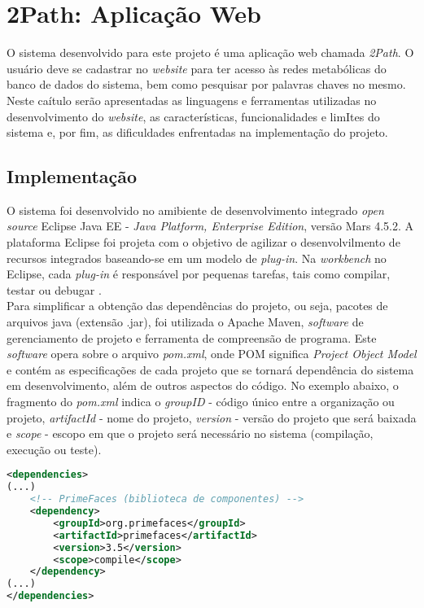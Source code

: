 \chapter{2Path: Aplicação Web}

\indent O sistema desenvolvido para este projeto é uma aplicação web chamada \textit{2Path}. O usuário deve se cadastrar no \textit{website} para ter acesso às redes metabólicas do banco de dados do sistema, bem como pesquisar por palavras chaves no mesmo. Neste caítulo serão apresentadas as linguagens e ferramentas utilizadas no desenvolvimento do \textit{website}, as características, funcionalidades e limItes do sistema e, por fim, as dificuldades enfrentadas na implementação do projeto.

\section{Implementação}

\indent O sistema foi desenvolvido no amibiente de desenvolvimento integrado \textit{open source} Eclipse Java EE - \textit{Java Platform, Enterprise Edition}, versão Mars 4.5.2. A plataforma Eclipse foi projeta com o objetivo de agilizar o desenvolvilmento de recursos integrados baseando-se em um modelo de \textit{plug-in}. Na \textit{workbench} no Eclipse, cada \textit{plug-in} é responsável por pequenas tarefas, tais como compilar, testar ou debugar \cite{eclipseDoc}. \\

\indent Para simplificar a obtenção das dependências do projeto, ou seja, pacotes de arquivos java (extensão .jar), foi utilizada o Apache Maven, \textit{software} de gerenciamento de projeto e ferramenta de compreensão de programa. Este \textit{software} opera sobre o arquivo \textit{pom.xml}, onde POM significa \textit{Project Object Model} e contém as especificações de cada projeto que se tornará dependência do sistema em desenvolvimento, além de outros aspectos do código. No exemplo abaixo, o fragmento do \textit{pom.xml} indica o \textit{groupID} - código único entre a organização ou projeto, \textit{artifactId} - nome do projeto, \textit{version} - versão do projeto que será baixada e \textit{scope} - escopo em que o projeto será necessário no sistema (compilação, execução ou teste). \\

\begin{lstlisting}[language=XML]
<dependencies>
(...)
	<!-- PrimeFaces (biblioteca de componentes) -->
	<dependency>
		<groupId>org.primefaces</groupId>
		<artifactId>primefaces</artifactId>
		<version>3.5</version>
		<scope>compile</scope>
	</dependency>
(...)
</dependencies>
\end{lstlisting}

